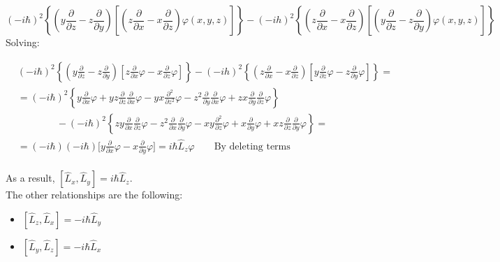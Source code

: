 	$$(-i \hbar)^{2}\left\{\left(y \frac{\partial}{\partial z}-z \frac{\partial}{\partial y}\right)\left[\left(z \frac{\partial}{\partial x}-x \frac{\partial}{\partial z}\right) \varphi(x, y, z)\right]\right\}-(-i h)^{2}\left\{\left(z \frac{\partial}{\partial x}-x \frac{\partial}{\partial z}\right)\left[\left(y \frac{\partial}{\partial z}-z \frac{\partial}{\partial y}\right) \varphi(x, y, z)\right]\right\}
	$$
	Solving:

	\begin{align*}
		&(-i \hbar)^{2}\left\{\left(y \frac{\partial}{\partial z}-z \frac{\partial}{\partial y}\right)\left[z \frac{\partial}{\partial x} \varphi-x \frac{\partial}{\partial z} \varphi\right]\right\}-(-i h)^{2}\left\{\left(z \frac{\partial}{\partial x}-x \frac{\partial}{\partial z}\right)\left[y \frac{\partial}{\partial z} \varphi-z \frac{\partial}{\partial y} \varphi\right]\right\}=\\
		&=(-i \hbar)^{2}\left\{{y \frac{\partial}{\partial x} \varphi+y z \frac{\partial}{\partial z} \frac{\partial}{\partial x} \varphi-y x \frac{\partial^{2}}{\partial z^{2}} \varphi-z^{2} \frac{\partial}{\partial y} \frac{\partial}{\partial x} \varphi+z x \frac{\partial}{\partial y} \frac{\partial}{\partial z} \varphi}\right\} \\
		&\qquad\qquad-(-i\hbar)^{2}\left\{{z y \frac{\partial}{\partial x} \frac{\partial}{\partial z} \varphi-z^{2} \frac{\partial}{\partial x} \frac{\partial}{\partial y} \varphi-x y \frac{\partial^{2}}{\partial z} \varphi+x \frac{\partial}{\partial y} \varphi+x z \frac{\partial}{\partial z} \frac{\partial}{\partial y} \varphi}\right\}=\\
		&=(-i \hbar)(-i \hbar)\biggl[y \frac{\partial}{\partial x} \varphi-x\frac{\partial}{\partial y}\varphi\biggr] = i\hbar \hat{L}_{z}\varphi \qquad \text {By deleting terms}\\
\end{align*}

	As a result, $\left[\hat{L}_{x}, \hat{L}_{y}\right]=i\hbar \hat{L}_{z}$.\\

	\noindent
	The other relationships are the following:

	\begin{multicols}{2}
		\begin{itemize}
			\item $\left[\hat{L}_{z}, \hat{L}_{x}\right]=-i \hbar \hat{L}_{y}$
			\item $\left[\hat{L}_{y}, \hat{L}_{z}\right]=-i \hbar \hat{L}_{x}$
		\end{itemize}
	\end{multicols}

